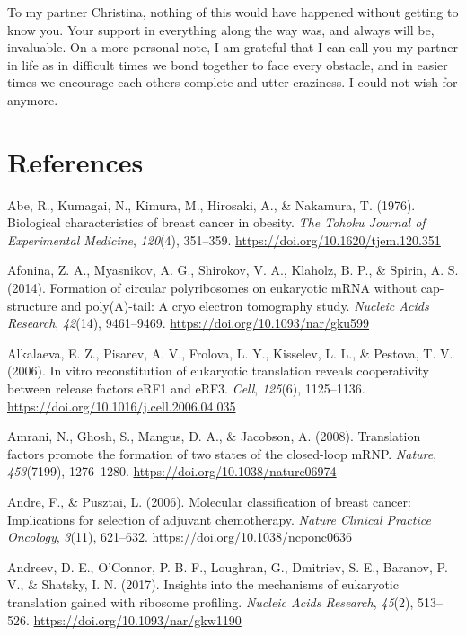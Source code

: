 \documentclass[12pt,openany]{book}
\begin{document}
To my partner Christina, nothing of this would have happened without
getting to know you. Your support in everything along the way was, and
always will be, invaluable. On a more personal note, I am grateful that
I can call you my partner in life as in difficult times we bond together
to face every obstacle, and in easier times we encourage each others
complete and utter craziness. I could not wish for anymore.

\chapter*{References}\label{references}

\hypertarget{refs}{}
\hypertarget{ref-Abe1976}{}
Abe, R., Kumagai, N., Kimura, M., Hirosaki, A., \& Nakamura, T. (1976).
Biological characteristics of breast cancer in obesity. \emph{The Tohoku
Journal of Experimental Medicine}, \emph{120}(4), 351--359.
\url{https://doi.org/10.1620/tjem.120.351}

\hypertarget{ref-Afonina2014}{}
Afonina, Z. A., Myasnikov, A. G., Shirokov, V. A., Klaholz, B. P., \&
Spirin, A. S. (2014). Formation of circular polyribosomes on eukaryotic
mRNA without cap-structure and poly(A)-tail: A cryo electron tomography
study. \emph{Nucleic Acids Research}, \emph{42}(14), 9461--9469.
\url{https://doi.org/10.1093/nar/gku599}

\hypertarget{ref-Alkalaeva2006}{}
Alkalaeva, E. Z., Pisarev, A. V., Frolova, L. Y., Kisselev, L. L., \&
Pestova, T. V. (2006). In vitro reconstitution of eukaryotic translation
reveals cooperativity between release factors eRF1 and eRF3.
\emph{Cell}, \emph{125}(6), 1125--1136.
\url{https://doi.org/10.1016/j.cell.2006.04.035}

\hypertarget{ref-Amrani2008}{}
Amrani, N., Ghosh, S., Mangus, D. A., \& Jacobson, A. (2008).
Translation factors promote the formation of two states of the
closed-loop mRNP. \emph{Nature}, \emph{453}(7199), 1276--1280.
\url{https://doi.org/10.1038/nature06974}

\hypertarget{ref-Andre2006}{}
Andre, F., \& Pusztai, L. (2006). Molecular classification of breast
cancer: Implications for selection of adjuvant chemotherapy.
\emph{Nature Clinical Practice Oncology}, \emph{3}(11), 621--632.
\url{https://doi.org/10.1038/ncponc0636}

\hypertarget{ref-Andreev2017}{}
Andreev, D. E., O'Connor, P. B. F., Loughran, G., Dmitriev, S. E.,
Baranov, P. V., \& Shatsky, I. N. (2017). Insights into the mechanisms
of eukaryotic translation gained with ribosome profiling. \emph{Nucleic
Acids Research}, \emph{45}(2), 513--526.
\url{https://doi.org/10.1093/nar/gkw1190}
\end{document}
